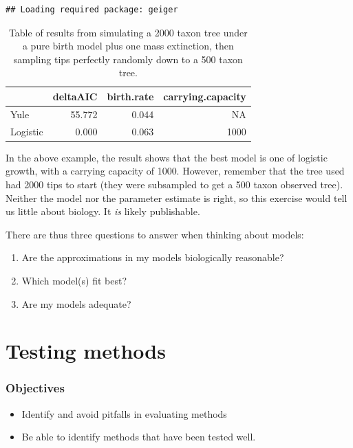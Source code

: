 \documentclass[]{article}
\providecommand{\tightlist}{%
  \setlength{\itemsep}{0pt}\setlength{\parskip}{0pt}}
\theoremstyle{definition}
\theoremstyle{definition}
\theoremstyle{definition}
\theoremstyle{remark}
\begin{document}
\begin{verbatim}
## Loading required package: geiger
\end{verbatim}

\begin{table}

\caption{\label{tab:unnamed-chunk-8}Table of results from simulating a 2000 taxon tree under a pure birth model plus one mass extinction, then sampling tips perfectly randomly down to a 500 taxon tree.}
\centering
\begin{tabular}[t]{l|r|r|r}
\hline
  & deltaAIC & birth.rate & carrying.capacity\\
\hline
Yule & 55.772 & 0.044 & NA\\
\hline
Logistic & 0.000 & 0.063 & 1000\\
\hline
\end{tabular}
\end{table}

In the above example, the result shows that the best model is one of
logistic growth, with a carrying capacity of 1000. However, remember
that the tree used had 2000 tips to start (they were subsampled to get a
500 taxon observed tree). Neither the model nor the parameter estimate
is right, so this exercise would tell us little about biology. It
\emph{is} likely publishable.

There are thus three questions to answer when thinking about models:

\begin{enumerate}
\def\labelenumi{\arabic{enumi})}
\tightlist
\item
  Are the approximations in my models biologically reasonable?
\item
  Which model(s) fit best?
\item
  Are my models adequate?
\end{enumerate}

\hypertarget{testing-methods}{%
\section{Testing methods}\label{testing-methods}}

\hypertarget{objectives-1}{%
\subsubsection{Objectives}\label{objectives-1}}

\begin{itemize}
\tightlist
\item
  Identify and avoid pitfalls in evaluating methods
\item
  Be able to identify methods that have been tested well.
\end{itemize}
\end{document}
